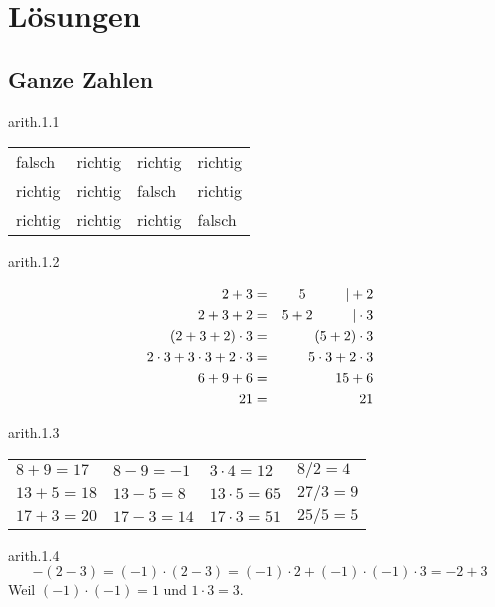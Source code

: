 
\chapter{Lösungen}


\section{Ganze Zahlen}
\begin{sol}{arith.1.1}
\begin{center}
\begin{tabular}{C{2cm}C{2cm}C{2cm}C{2cm}}
falsch & richtig & richtig & richtig \\
richtig & richtig & falsch & richtig \\
richtig & richtig & richtig & falsch
\end{tabular}
\end{center}
\end{sol}


\begin{sol}{arith.1.2}

\begin{eqnarray*}
2+3 &=& 5 \hskip 1cm | +2 \\
2+3+2 &=& 5+2 \hskip 1cm | \cdot 3 \\
(2+3+2) \cdot 3 &=& (5+2)\cdot 3 \\
2\cdot 3 + 3\cdot 3 + 2\cdot 3 &=& 5\cdot 3 +2 \cdot 3 \\
6+9+6 &=& 15 + 6 \\
21 &=& 21
\end{eqnarray*}

\end{sol}

\begin{sol}{arith.1.3}
\begin{center}
\begin{tabular}{C{2cm}C{2cm}C{2cm}C{2cm}}
$8+9=17$ & $8-9 =-1$ & $3\cdot 4=12$ & $8/2=4$ \\
$13+5=18$ & $13-5=8$ & $13\cdot 5=65$ & $27/3=9$ \\
$17+3=20$ & $17-3=14$ & $17\cdot 3=51$ & $25/5=5$
\end{tabular}
\end{center}
\end{sol}

\begin{sol}{arith.1.4}
\[-(2-3) = (-1)\cdot (2-3) = (-1)\cdot 2 + (-1)\cdot (-1) \cdot 3 = -2+3\]
Weil $(-1)\cdot (-1)=1$ und $1\cdot 3 = 3$.
\end{sol}

